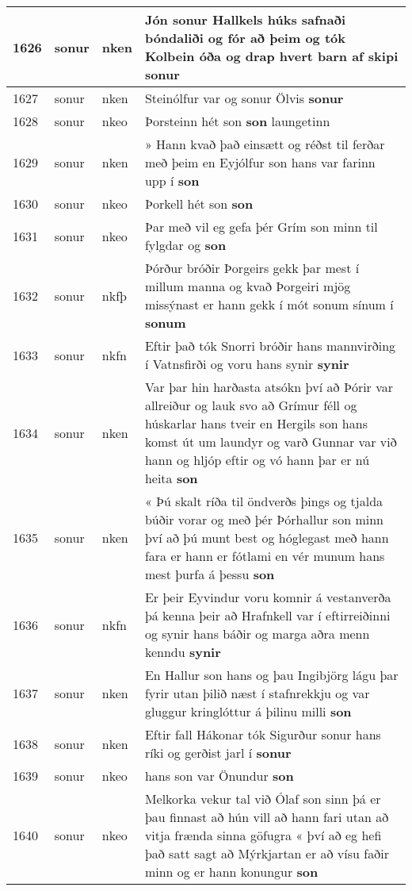 \documentclass{article}
\begin{document}
\begin{longtable}{p{1cm}|p{1cm}|p{1cm}|p{13cm}}
\hline
1626&sonur&nken&Jón sonur Hallkels húks safnaði bóndaliði og fór að þeim og tók Kolbein óða og drap hvert barn af skipi \textbf{sonur} \\
\hline
1627&sonur&nken&Steinólfur var og sonur Ölvis \textbf{sonur} \\
\hline
1628&sonur&nkeo&Þorsteinn hét son \textbf{son} laungetinn\\
\hline
1629&sonur&nken&» Hann kvað það einsætt og réðst til ferðar með þeim en Eyjólfur son hans var farinn upp í \textbf{son} \\
\hline
1630&sonur&nkeo&Þorkell hét son \textbf{son} \\
\hline
1631&sonur&nkeo&Þar með vil eg gefa þér Grím son minn til fylgdar og \textbf{son} \\
\hline
1632&sonur&nkfþ&Þórður bróðir Þorgeirs gekk þar mest í millum manna og kvað Þorgeiri mjög missýnast er hann gekk í mót sonum sínum í \textbf{sonum} \\
\hline
1633&sonur&nkfn&Eftir það tók Snorri bróðir hans mannvirðing í Vatnsfirði og voru hans synir \textbf{synir} \\
\hline
1634&sonur&nken&Var þar hin harðasta atsókn því að Þórir var allreiður og lauk svo að Grímur féll og húskarlar hans tveir en Hergils son hans komst út um laundyr og varð Gunnar var við hann og hljóp eftir og vó hann þar er nú heita \textbf{son} \\
\hline
1635&sonur&nken&« Þú skalt ríða til öndverðs þings og tjalda búðir vorar og með þér Þórhallur son minn því að þú munt best og hóglegast með hann fara er hann er fótlami en vér munum hans mest þurfa á þessu \textbf{son} \\
\hline
1636&sonur&nkfn&Er þeir Eyvindur voru komnir á vestanverða þá kenna þeir að Hrafnkell var í eftirreiðinni og synir hans báðir og marga aðra menn kenndu \textbf{synir} \\
\hline
1637&sonur&nken&En Hallur son hans og þau Ingibjörg lágu þar fyrir utan þilið næst í stafnrekkju og var gluggur kringlóttur á þilinu milli \textbf{son} \\
\hline
1638&sonur&nken&Eftir fall Hákonar tók Sigurður sonur hans ríki og gerðist jarl í \textbf{sonur} \\
\hline
1639&sonur&nkeo&hans son var Önundur \textbf{son} \\
\hline
1640&sonur&nkeo&Melkorka vekur tal við Ólaf son sinn þá er þau finnast að hún vill að hann fari utan að vitja frænda sinna göfugra « því að eg hefi það satt sagt að Mýrkjartan er að vísu faðir minn og er hann konungur \textbf{son} \\

\end{longtable}
\end{document}
